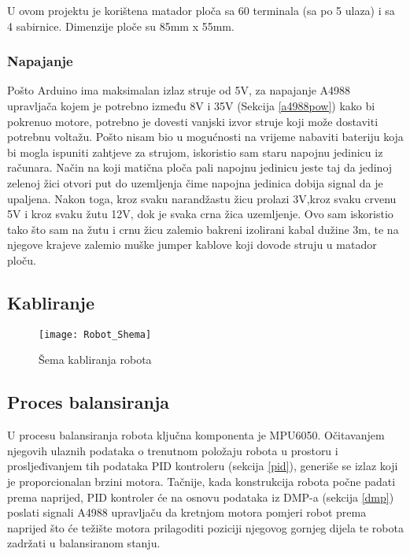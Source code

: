 \documentclass[../Document.tex]{subfiles}
\begin{document}

U ovom projektu je korištena matador ploča sa 60 terminala (sa po 5 ulaza) i sa 4 sabirnice. Dimenzije ploče su 85mm x 55mm.

\subsubsection{Napajanje}
Pošto Arduino ima maksimalan izlaz struje od 5V, za napajanje A4988 upravljača kojem je potrebno između 8V i 35V (Sekcija \ref{a4988pow}) kako bi pokrenuo motore, potrebno je dovesti vanjski izvor struje koji može dostaviti potrebnu voltažu. Pošto nisam bio u mogućnosti na vrijeme nabaviti bateriju koja bi mogla ispuniti zahtjeve za strujom, iskoristio sam staru napojnu jedinicu iz računara. Način na koji matična ploča pali napojnu jedinicu jeste taj da jedinoj zelenoj žici otvori put do uzemljenja čime napojna jedinica dobija signal da je upaljena. Nakon toga, kroz svaku narandžastu žicu prolazi 3V,kroz svaku crvenu 5V i kroz svaku žutu 12V, dok je svaka crna žica uzemljenje. Ovo sam iskoristio tako što sam na žutu i crnu žicu zalemio bakreni izolirani kabal dužine 3m, te na njegove krajeve zalemio muške jumper kablove koji dovode struju u matador ploču.


\subsection{Kabliranje}

\begin{figure}[h!]
    \centering
    \texttt{[image: Robot\_Shema]}
    \caption{Šema kabliranja robota}
\end{figure}

\subsection{Proces balansiranja}
U procesu balansiranja robota ključna komponenta je MPU6050. Očitavanjem njegovih ulaznih podataka o trenutnom položaju robota u prostoru i prosljeđivanjem tih podataka PID kontroleru (sekcija \ref{pid}), generiše se izlaz koji je proporcionalan brzini motora. Tačnije, kada konstrukcija robota počne padati prema naprijed, PID kontroler će na osnovu podataka iz DMP-a (sekcija \ref{dmp}) poslati signali A4988 upravljaču da kretnjom motora pomjeri robot prema naprijed što će težište motora prilagoditi poziciji njegovog gornjeg dijela te robota zadržati u balansiranom stanju.
\end{document}
